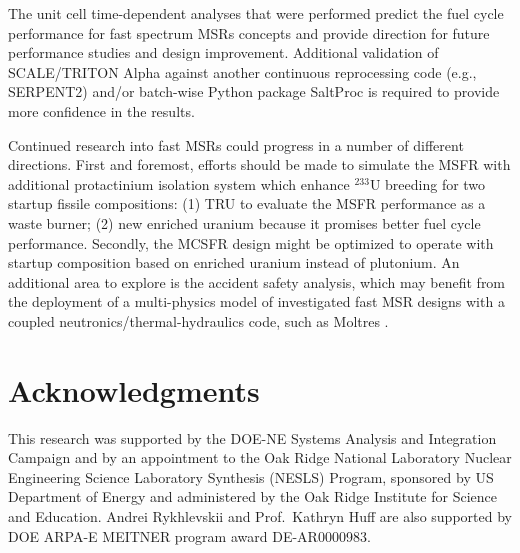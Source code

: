 \documentclass[letterpaper]{mandc2019}
\begin{document}

The unit cell time-dependent analyses that were performed predict the fuel cycle performance for fast spectrum \glspl{MSR} concepts and provide direction for future performance studies and design improvement. 
Additional validation of SCALE/TRITON Alpha against another continuous reprocessing code (e.g., SERPENT2) and/or batch-wise Python package SaltProc \cite{rykhlevskii_advanced_2018} is required to provide more confidence in the results.

Continued research into fast \glspl{MSR} could progress in a number of different directions. 
First and foremost, efforts should be made to simulate the \gls{MSFR} with additional protactinium isolation system which enhance $^{233}$U breeding for two startup fissile compositions: (1) TRU to evaluate the \gls{MSFR} performance as a waste burner; (2) new enriched uranium because it promises better fuel cycle performance. 
Secondly, the \gls{MCSFR} design might be optimized to operate with startup composition based on enriched uranium instead of plutonium. 
An additional area to explore is the accident safety analysis, which may benefit from the deployment of a multi-physics model of investigated fast \gls{MSR} designs with a coupled neutronics/thermal-hydraulics code, such as Moltres \cite{lindsay_introduction_2018}. 
\section{Acknowledgments}
This research was supported by the DOE-NE Systems Analysis and Integration Campaign and by an appointment to the Oak Ridge National Laboratory Nuclear Engineering Science Laboratory Synthesis (NESLS) Program, sponsored by US Department of Energy and administered by the Oak Ridge Institute for Science and Education. 
Andrei Rykhlevskii and Prof.\ Kathryn Huff are also supported by DOE ARPA-E MEITNER program award DE-AR0000983.
\setlength{\baselineskip}{12pt}
\setlength{\bibsep}{4pt}


\end{document}
